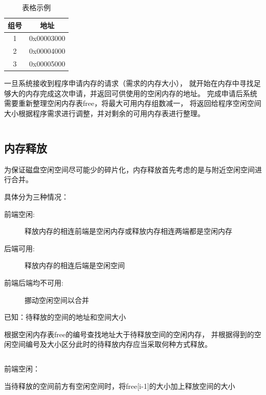 \begin{table}[!ht]
  \centering
  \begin{tabular}{|c{4cm}|c{8cm}|}
    \hline 
    组号 & 地址 \\
    \hline 
    1 & 0x00003000 \\ 
    \hline 
    2 & 0x00004000 \\
    \hline 
    3 & 0x00005000 \\
    \hline
  \end{tabular}
  \caption{表格示例}
  \label{tab:hello}
\end{table}

一旦系统接收到程序申请内存的请求（需求的内存大小），
就开始在内存中寻找足够大的内存完成这次申请，并返回可供使用的空闲内存的地址。
完成申请后系统需要重新整理空闲内存表free，将最大可用内存组数减一，
将返回给程序空闲空间大小根据程序需求进行调整，并对剩余的可用内存表进行整理。

\begin{listing}[H]
  \inputminted[tabsize=2, firstline=68, lastline=78,
  linenos=true]{c}{../ZOS/src/kernel/memory.c}
\end{listing}

\newpage
\subsection{内存释放}

为保证磁盘空闲空间尽可能少的碎片化，内存释放首先考虑的是与附近空闲空间进行合并。

具体分为三种情况：

\begin{description}
\item[前端空闲:]释放内存的相连前端是空闲内存或释放内存相连两端都是空闲内存
\item[后端可用:]释放内存的相连后端是空闲空间
\item[前端后端均不可用:]挪动空闲空间以合并
\end{description}

已知：待释放的空间的地址和空间大小

根据空闲内存表free的编号查找地址大于待释放空间的空闲内存，
并根据得到的空闲空间编号及大小区分此时的待释放内存应当采取何种方式释放。
\begin{listing}[H]
  \inputminted[tabsize=2, firstline=91, lastline=95,
  linenos=true]{c}{../ZOS/src/kernel/memory.c}
\end{listing}

\newpage
前端空闲：

当待释放的空间前方有空闲空间时，将free[i-1]的大小加上释放空间的大小

